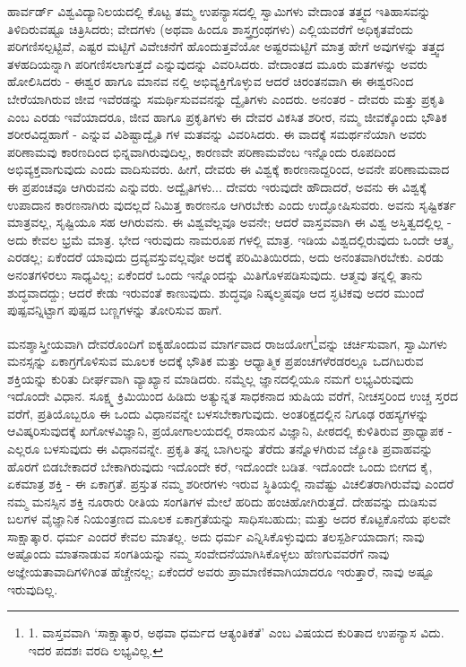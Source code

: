 ಹಾರ್ವರ್ಡ್ ವಿಶ್ವವಿದ್ಯಾನಿಲಯದಲ್ಲಿ ಕೊಟ್ಟ ತಮ್ಮ ಉಪನ್ಯಾಸದಲ್ಲಿ ಸ್ವಾಮಿಗಳು ವೇದಾಂತ ತತ್ತ್ವದ ಇತಿಹಾಸವನ್ನು ತಿಳಿದಿರುವಷ್ಟೂ ಚಿತ್ರಿಸಿದರು; ವೇದಗಳು (ಅಥವಾ ಹಿಂದೂ ಶಾಸ್ತ್ರಗ್ರಂಥಗಳು) ಎಲ್ಲಿಯವರೆಗೆ ಅಧಿಕೃತವೆಂದು ಪರಿಗಣಿಸಲ್ಪಟ್ಟಿವೆ, ಎಷ್ಟರ ಮಟ್ಟಿಗೆ ವಿವೇಚನೆಗೆ ಹೊಂದುತ್ತವೆಯೋ ಅಷ್ಟರಮಟ್ಟಿಗೆ ಮಾತ್ರ ಹೇಗೆ ಅವುಗಳನ್ನು ತತ್ತ್ವದ ತಳಹದಿಯನ್ನಾಗಿ ಪರಿಗಣಿಸಲಾಗುತ್ತದೆ ಎನ್ನುವುದನ್ನು ವಿವರಿಸಿದರು. ವೇದಾಂತದ ಮೂರು ಮತಗಳನ್ನು ಅವರು ಹೋಲಿಸಿದರು - ಈಶ್ವರ ಹಾಗೂ ಮಾನವ ನಲ್ಲಿ ಅಭಿವ್ಯಕ್ತಿಗೊಳ್ಳುವ ಆದರೆ ಚಿರಂತನವಾಗಿ ಈ ಈಶ್ವರನಿಂದ ಬೇರೆಯಾಗಿರುವ ಜೀವ ಇವೆರಡನ್ನು ಸಮರ್ಥಿಸುವವನನ್ನು ದ್ವೈತಿಗಳು ಎಂದರು. ಅನಂತರ - ದೇವರು ಮತ್ತು ಪ್ರಕೃತಿ ಎಂಬ ಎರಡು ಇವೆಯಾದರೂ, ಜೀವ ಹಾಗೂ ಪ್ರಕೃತಿಗಳು ಈ ದೇವರ ವಿಕಸಿತ ಶರೀರ, ನಮ್ಮ ಜೀವಕ್ಕೊಂದು ಭೌತಿಕ ಶರೀರವಿದ್ದಹಾಗೆ - ಎನ್ನುವ ವಿಶಿಷ್ಟಾದ್ವೈತಿ ಗಳ ಮತವನ್ನು ವಿವರಿಸಿದರು. ಈ ವಾದಕ್ಕೆ ಸಮರ್ಥನೆಯಾಗಿ ಅವರು ಪರಿಣಾಮವು ಕಾರಣದಿಂದ ಭಿನ್ನವಾಗಿರುವುದಿಲ್ಲ, ಕಾರಣವೇ ಪರಿಣಾಮವೆಂಬ ಇನ್ನೊಂದು ರೂಪದಿಂದ ಅಭಿವ್ಯಕ್ತವಾಗುವುದು ಎಂದು ವಾದಿಸುವರು. ಹೀಗೆ, ದೇವರು ಈ ವಿಶ್ವಕ್ಕೆ ಕಾರಣನಾದ್ದರಿಂದ, ಅವನೇ ಪರಿಣಾಮವಾದ ಈ ಪ್ರಪಂಚವೂ ಆಗಿರುವನು ಎನ್ನುವರು. ಅದ್ವೈತಿಗಳು... ದೇವರು ಇರುವುದೇ ಹೌದಾದರೆ, ಅವನು ಈ ವಿಶ್ವಕ್ಕೆ ಉಪಾದಾನ ಕಾರಣನಾಗಿರು ವುದಲ್ಲದೆ ನಿಮಿತ್ತ ಕಾರಣನೂ ಆಗಿರಬೇಕು ಎಂದು ಉದ್ಘೋಷಿಸುವರು. ಅವನು ಸೃಷ್ಟಿಕರ್ತ ಮಾತ್ರವಲ್ಲ, ಸೃಷ್ಟಿಯೂ ಸಹ ಆಗಿರುವನು. ಈ ವಿಶ್ವವೆಲ್ಲವೂ ಅವನೇ; ಆದರೆ ವಾಸ್ತವವಾಗಿ ಈ ವಿಶ್ವ ಅಸ್ತಿತ್ವದಲ್ಲಿಲ್ಲ - ಅದು ಕೇವಲ ಭ್ರಮೆ ಮಾತ್ರ. ಭೇದ ಇರುವುದು ನಾಮರೂಪ ಗಳಲ್ಲಿ ಮಾತ್ರ. ಇಡಿಯ ವಿಶ್ವದಲ್ಲಿರುವುದು ಒಂದೇ ಆತ್ಮ, ಎರಡಲ್ಲ; ಏಕೆಂದರೆ ಯಾವುದು ದ್ರವ್ಯವಸ್ತುವಲ್ಲವೋ ಅದಕ್ಕೆ ಪರಿಮಿತಿಯಿರದು, ಅದು ಅನಂತವಾಗಿರಬೇಕು. ಎರಡು ಅನಂತಗಳಿರಲು ಸಾಧ್ಯವಿಲ್ಲ; ಏಕೆಂದರೆ ಒಂದು ಇನ್ನೊಂದನ್ನು ಮಿತಿಗೊಳಪಡಿಸುವುದು. ಆತ್ಮವು ತನ್ನಲ್ಲಿ ತಾನು ಶುದ್ಧವಾದದ್ದು; ಆದರೆ ಕೇಡು ಇರುವಂತೆ ಕಾಣುವುದು. ಶುದ್ಧವೂ ನಿಷ್ಕಲ್ಮಷವೂ ಆದ ಸ್ಘಟಿಕವು ಅದರ ಮುಂದೆ ಪುಷ್ಪವನ್ನಿಟ್ಟಾಗ ಪುಷ್ಪದ ಬಣ್ಣಗಳನ್ನು ತೋರಿಸುವ ಹಾಗೆ.

ಮನಶ್ಶಾಸ್ತ್ರೀಯವಾಗಿ ದೇವರೊಂದಿಗೆ ಐಕ್ಯಹೊಂದುವ ಮಾರ್ಗವಾದ ರಾಜಯೋಗ\footnote{1. ವಾಸ್ತವವಾಗಿ ‘ಸಾಕ್ಷಾತ್ಕಾರ, ಅಥವಾ ಧರ್ಮದ ಆತ್ಯಂತಿಕತೆ’ ಎಂಬ ವಿಷಯದ ಕುರಿತಾದ ಉಪನ್ಯಾಸ ವಿದು. ಇದರ ಪದಶಃ ವರದಿ ಲಭ್ಯವಿಲ್ಲ.}ವನ್ನು ಚರ್ಚಿಸುವಾಗ, ಸ್ವಾಮಿಗಳು ಮನಸ್ಸನ್ನು ಏಕಾಗ್ರಗೊಳಿಸುವ ಮೂಲಕ ಅದಕ್ಕೆ ಭೌತಿಕ ಮತ್ತು ಆಧ್ಯಾತ್ಮಿಕ ಪ್ರಪಂಚಗಳೆರಡರಲ್ಲೂ ಒದಗಿಬರುವ ಶಕ್ತಿಯನ್ನು ಕುರಿತು ದೀರ್ಘವಾಗಿ ವ್ಯಾಖ್ಯಾನ ಮಾಡಿದರು. ನಮ್ಮೆಲ್ಲ ಜ್ಞಾನದಲ್ಲಿಯೂ ನಮಗೆ ಲಭ್ಯವಿರುವುದು ಇದೊಂದೇ ವಿಧಾನ. ಸೂಕ್ಷ್ಮ ಕ್ರಿಮಿಯಿಂದ ಹಿಡಿದು ಅತ್ಯುನ್ನತ ಸಾಧಕನಾದ ಋಷಿಯ ವರೆಗೆ, ನೀಚಸ್ತರಿಂದ ಉಚ್ಚ ಸ್ತರದ ವರೆಗೆ, ಪ್ರತಿಯೊಬ್ಬರೂ ಈ ಒಂದು ವಿಧಾನವನ್ನೇ ಬಳಸಬೇಕಾಗುವುದು. ಅಂತರಿಕ್ಷದಲ್ಲಿನ ನಿಗೂಢ ರಹಸ್ಯಗಳನ್ನು ಆವಿಷ್ಕರಿಸುವುದಕ್ಕೆ ಖಗೋಳವಿಜ್ಞಾನಿ, ಪ್ರಯೋಗಾಲಯದಲ್ಲಿ ರಸಾಯನ ವಿಜ್ಞಾನಿ, ಪೀಠದಲ್ಲಿ ಕುಳಿತಿರುವ ಪ್ರಾಧ್ಯಾಪಕ - ಎಲ್ಲರೂ ಬಳಸುವುದು ಈ ವಿಧಾನವನ್ನೇ. ಪ್ರಕೃತಿ ತನ್ನ ಬಾಗಿಲನ್ನು ತೆರೆದು ತನ್ನೊಳಗಿರುವ ಜ್ಯೋತಿ ಪ್ರವಾಹವನ್ನು ಹೊರಗೆ ಬಿಡಬೇಕಾದರೆ ಬೇಕಾಗಿರುವುದು ಇದೊಂದೇ ಕರೆ, ಇದೊಂದೇ ಬಡಿತ. ಇದೊಂದೇ ಒಂದು ಬೀಗದ ಕೈ, ಏಕಮಾತ್ರ ಶಕ್ತಿ - ಈ ಏಕಾಗ್ರತೆ. ಪ್ರಸ್ತುತ ನಮ್ಮ ಶರೀರಗಳು ಇರುವ ಸ್ಥಿತಿಯಲ್ಲಿ ನಾವೆಷ್ಟು ವಿಚಲಿತರಾಗಿರುವೆವು ಎಂದರೆ ನಮ್ಮ ಮನಸ್ಸಿನ ಶಕ್ತಿ ನೂರಾರು ರೀತಿಯ ಸಂಗತಿಗಳ ಮೇಲೆ ಹರಿದು ಹಂಚಿಹೋಗಿರುತ್ತದೆ. ದೇಹವನ್ನು ದುಡಿಸುವ ಬಲಗಳ ವೈಜ್ಞಾನಿಕ ನಿಯಂತ್ರಣದ ಮೂಲಕ ಏಕಾಗ್ರತೆಯನ್ನು ಸಾಧಿಸಬಹುದು; ಮತ್ತು ಅದರ ಕೊಟ್ಟಕೊನೆಯ ಫಲವೇ ಸಾಕ್ಷಾತ್ಕಾರ. ಧರ್ಮ ಎಂದರೆ ಕೇವಲ ಮಾತಲ್ಲ. ಅದು ಧರ್ಮ ಎನ್ನಿಸಿಕೊಳ್ಳುವುದು ತಲಸ್ಪರ್ಶಿಯಾದಾಗ; ನಾವು ಅಷ್ಟೊಂದು ಮಾತನಾಡುವ ಸಂಗತಿಯನ್ನು ನಮ್ಮ ಸಂವೇದನೆಯಾಗಿಸಿಕೊಳ್ಳಲು ಹೆಣಗುವವರೆಗೆ ನಾವು ಅಜ್ಞೇಯತಾವಾದಿಗಳಿಗಿಂತ ಹೆಚ್ಚೇನಲ್ಲ; ಏಕೆಂದರೆ ಅವರು ಪ್ರಾಮಾಣಿಕವಾಗಿಯಾದರೂ ಇರುತ್ತಾರೆ, ನಾವು ಅಷ್ಟೂ ಇರುವುದಿಲ್ಲ.

